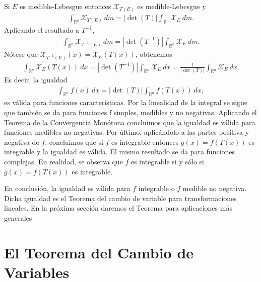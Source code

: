 \begin{obs}
    Si $E$ es medible-Lebesgue entonces $\mathcal{X}_{T(E)}$ es medible-Lebesgue y
    \begin{align*}
        \int_{\mathbb{R}^n}{\mathcal{X}_{T(E)} \ dm} = |\det(T)|\int_{\mathbb{R}^n}{\mathcal{X}_{E} \ dm}.
    \end{align*}
    Aplicando el resultado a $T^{-1}$,
    \begin{align*}
        \int_{\mathbb{R}^n}{\mathcal{X}_{T^{-1}(E)} \ dm} = |\det(T^{-1})|\int_{\mathbb{R}^n}{\mathcal{X}_{E} \ dm}.
    \end{align*}
    Nótese que $\mathcal{X}_{T^{-1}(E)}(x) = \mathcal{X}_{E}{(T(x))}$, obtenemos
    \begin{align*}
        \int_{\mathbb{R}^n}{\mathcal{X}_E(T(x)) \ dx} = |\det(T^{-1})|\int_{\mathbb{R}^n}{\mathcal{X}_{E} \ dx} = \frac{1}{|\det(T)|}\int_{\mathbb{R}^n}{\mathcal{X}_{E} \ dx}.
    \end{align*}
    Es decir, la igualdad
    \begin{align*}
        \boxed{
            \int_{\mathbb{R}^n}{f(x) \ dx} = |\det(T)|\int_{\mathbb{R}^n}{f(T(x)) \ dx},
        }
    \end{align*}
    es válida para funciones características. Por la linealidad de la integral se sigue que también se da para funciones f simples, medibles y no negativas. Aplicando el Teorema de la Convergencia Monótona concluimos que la igualdad es válida para funciones medibles no negativas. Por último, aplicándolo a las partes positiva y negativa de $f$, concluimos que si $f$ es integrable entonces $g(x) = f(T(x))$ es integrable y la igualdad es válida. El mismo resultado se da para funciones complejas. En realidad, se observa que $f$ es integrable si y sólo si $g(x) = f(T(x))$ es integrable.

    En conclusión, la igualdad es válida para $f$ integrable o $f$ medible no negativa. Dicha igualdad es el Teorema del cambio de variable para transformaciones lineales. En la próxima sección daremos el Teorema para aplicaciones más generales
\end{obs}

\section{El Teorema del Cambio de Variables}

